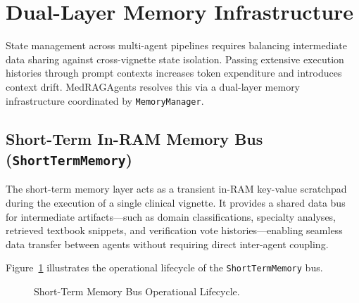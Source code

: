 \section{Dual-Layer Memory Infrastructure}
\label{sec:dual_layer_memory}

State management across multi-agent pipelines requires balancing intermediate data sharing against cross-vignette state isolation. Passing extensive execution histories through prompt contexts increases token expenditure and introduces context drift. MedRAGAgents resolves this via a dual-layer memory infrastructure coordinated by \texttt{MemoryManager}.

\subsection{Short-Term In-RAM Memory Bus (\texttt{ShortTermMemory})}

The short-term memory layer acts as a transient in-RAM key-value scratchpad during the execution of a single clinical vignette. It provides a shared data bus for intermediate artifacts—such as domain classifications, specialty analyses, retrieved textbook snippets, and verification vote histories—enabling seamless data transfer between agents without requiring direct inter-agent coupling.

Figure~\ref{fig:short_term_bus} illustrates the operational lifecycle of the \texttt{ShortTermMemory} bus.

\begin{figure}[htbp]
\centering
{}
\caption{Short-Term Memory Bus Operational Lifecycle.}
\label{fig:short_term_bus}
\end{figure}

